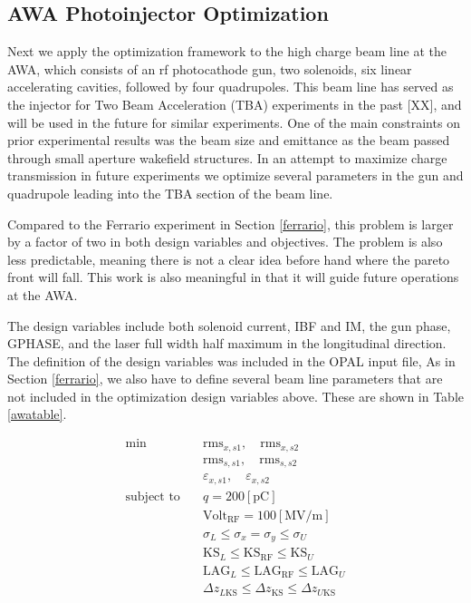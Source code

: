   
  
\subsection{AWA Photoinjector Optimization}
Next we apply the optimization framework to the high charge beam line at the AWA, 
which consists of an rf photocathode gun, two solenoids, six linear accelerating cavities, 
followed by four quadrupoles. This beam line has served as the injector for Two Beam 
Acceleration (TBA) experiments in the past [XX], and will be used in the future for 
similar experiments. One of the main constraints on prior experimental 
results was the beam size and emittance as the beam passed through small aperture 
wakefield structures. In an attempt to maximize charge transmission in future experiments
we optimize several parameters in the gun and quadrupole leading into the 
TBA section of the beam line.

Compared to the Ferrario experiment in Section \ref{ferrario}, 
this problem is larger by a factor of two in both design variables and objectives.
The problem is also less predictable, meaning there is not a clear idea
before hand where the pareto front will fall. This work is also meaningful in that
it will guide future operations at the AWA.

The design variables include both solenoid current, IBF and IM,
the gun phase, GPHASE, and the laser full width half maximum in 
the longitudinal direction. The definition of the design variables 
was included in the OPAL input file, 
As in Section \ref{ferrario}, 
we also have to define several beam line parameters that 
are not included in the optimization design variables above.
These are shown in Table \ref{awatable}. 

\begin{align}
\text{min}  \quad & \text{rms}_{x, s1}, \quad \text{rms}_{x, s2} \label{eq:awa:p1}\\
& \text{rms}_{s, s1}, \quad \text{rms}_{s, s2} \label{eq:awa:p2}\\
& \varepsilon_{x,s1}, \quad \varepsilon_{x,s2} \label{eq:awa:p3} \\
\text{subject to} \quad & q = 200 \left[\text{pC}\right] \label{eq:awa:firstconstr}\\
\quad & \text{Volt}_{\text{RF}} = 100 \left[\text{MV/m}\right] \label{eq:awa:lastconstr}\\
\quad & \sigma_{L} \leq \sigma_x = \sigma_y \leq \sigma_{U} \label{eq:awa:firstdvar}\\
\quad & \text{KS}_{L} \leq \text{KS}_{\text{RF}} \leq \text{KS}_{U} \label{eq:awa:seconddvar}\\
\quad & \text{LAG}_{L} \leq \text{LAG}_{\text{RF}} \leq \text{LAG}_{U} \\
\quad & \Delta z_{L\text{KS}} \leq \Delta z_{\text{KS}} \leq \Delta z_{U\text{KS}} \label{eq:awa:lastdvar}
\end{align}


